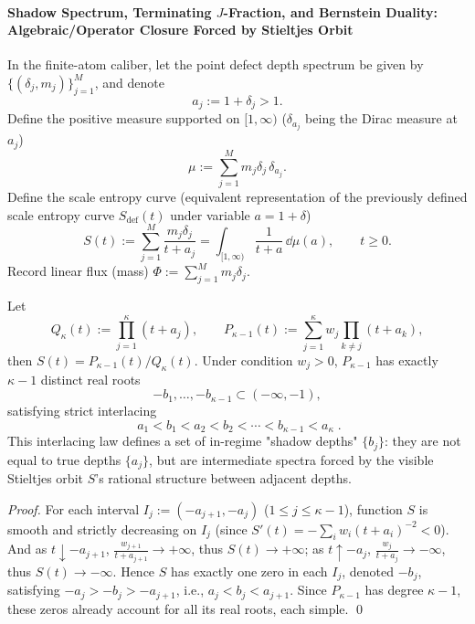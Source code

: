\paragraph{Shadow Spectrum, Terminating \texorpdfstring{$J$}{J}-Fraction, and Bernstein Duality: Algebraic/Operator Closure Forced by Stieltjes Orbit}
In the finite-atom caliber, let the point defect depth spectrum be given by \(\{(\delta_j,m_j)\}_{j=1}^{M}\), and denote
\[
a_j:=1+\delta_j>1.
\]
Define the positive measure supported on \([1,\infty)\) (\(\delta_{a_j}\) being the Dirac measure at \(a_j\))
\[
\mu:=\sum_{j=1}^{M} m_j\delta_j\,\delta_{a_j}.
\]
Define the scale entropy curve (equivalent representation of the previously defined scale entropy curve \(S_{\mathrm{def}}(t)\) under variable \(a=1+\delta\))
\[
S(t):=\sum_{j=1}^{M}\frac{m_j\delta_j}{t+a_j}
=\int_{[1,\infty)}\frac{1}{t+a}\,\dd\mu(a),
\qquad t\ge 0.
\]
Record linear flux (mass) \(\Phi:=\sum_{j=1}^{M}m_j\delta_j\).

\begin{proposition}\label{con:xi-shadow-spectrum-interlacing}
Let
\[
Q_{\kappa}(t):=\prod_{j=1}^{\kappa}(t+a_j),
\qquad
P_{\kappa-1}(t):=\sum_{j=1}^{\kappa} w_j\!\!\prod_{k\ne j}(t+a_k),
\]
then \(S(t)=P_{\kappa-1}(t)/Q_{\kappa}(t)\).
Under condition \(w_j>0\), \(P_{\kappa-1}\) has exactly \(\kappa-1\) distinct real roots
\[
-b_1,\dots,-b_{\kappa-1}\subset(-\infty,-1),
\]
satisfying strict interlacing
\[
\boxed{\;
a_1<b_1<a_2<b_2<\cdots<b_{\kappa-1}<a_{\kappa}\; }.
\]
This interlacing law defines a set of in-regime "shadow depths" \(\{b_j\}\): they are not equal to true depths \(\{a_j\}\), but are intermediate spectra forced by the visible Stieltjes orbit \(S\)'s rational structure between adjacent depths.
\end{proposition}
\begin{proof}
For each interval \(I_j:=(-a_{j+1},-a_j)\) (\(1\le j\le \kappa-1\)), function \(S\) is smooth and strictly decreasing on \(I_j\) (since \(S'(t)=-\sum_i w_i(t+a_i)^{-2}<0\)).
And as \(t\downarrow -a_{j+1}\), \(\frac{w_{j+1}}{t+a_{j+1}}\to +\infty\), thus \(S(t)\to +\infty\); as \(t\uparrow -a_j\), \(\frac{w_{j}}{t+a_{j}}\to -\infty\), thus \(S(t)\to -\infty\).
Hence \(S\) has exactly one zero in each \(I_j\), denoted \(-b_j\), satisfying \(-a_j>-b_j>-a_{j+1}\), i.e., \(a_j<b_j<a_{j+1}\).
Since \(P_{\kappa-1}\) has degree \(\kappa-1\), these zeros already account for all its real roots, each simple. \qed
\end{proof}

